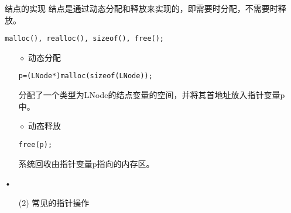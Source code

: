 \begin{frame}[fragile]\ft{\subsecname}
\begin{block}{结点的实现}
结点是通过动态分配和释放来实现的，即需要时分配，不需要时释放。
\begin{lstlisting}[frame=no,backgroundcolor=\color{red!0!green!0!blue!0}]
malloc(), realloc(), sizeof(), free();
\end{lstlisting}
\pause 
\begin{itemize}
\item[$\diamond$]
动态分配
\begin{lstlisting}[frame=no,backgroundcolor=\color{red!0!green!0!blue!0}]
p=(LNode*)malloc(sizeof(LNode));
\end{lstlisting}
分配了一个类型为{\ttfamily LNode}的结点变量的空间，并将其首地址放入指针变量{\ttfamily p}中。\\[0.1in]
\item[$\diamond$]
动态释放
\begin{lstlisting}[frame=no,backgroundcolor=\color{red!0!green!0!blue!0}]
free(p);
\end{lstlisting}
系统回收由指针变量{\ttfamily p}指向的内存区。
\end{itemize}•
\end{block}
\end{frame}

 


\begin{frame}[fragile]\ft{\subsecname}
\begin{itemize}
\item[(2)] 常见的指针操作

\pause 


\end{itemize}
 
\end{frame}

\begin{frame}[fragile]\ft{\subsecname}

\pause 


 
 
\end{frame}


